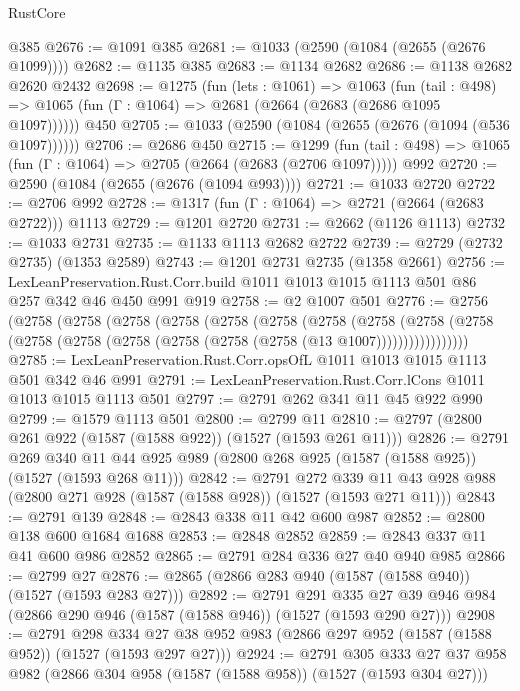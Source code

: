 \begin{lexlean}{RustCore}
\begin{coremodule}
    @385
@2676 := @1091 @385
@2681 := @1033 (@2590 (@1084 (@2655 (@2676 @1099))))
@2682 := @1135 @385
@2683 := @1134 @2682
@2686 := @1138 @2682 @2620 @2432
@2698 := @1275
    (fun (lets : @1061) =>
    @1063
      (fun (tail : @498) => @1065 (fun (Γ : @1064) => @2681 (@2664 (@2683 (@2686 @1095 @1097))))))
    @450
@2705 := @1033 (@2590 (@1084 (@2655 (@2676 (@1094 (@536 @1097))))))
@2706 := @2686 @450
@2715 := @1299
    (fun (tail : @498) => @1065 (fun (Γ : @1064) => @2705 (@2664 (@2683 (@2706 @1097)))))
    @992
@2720 := @2590 (@1084 (@2655 (@2676 (@1094 @993))))
@2721 := @1033 @2720
@2722 := @2706 @992
@2728 := @1317 (fun (Γ : @1064) => @2721 (@2664 (@2683 @2722))) @1113
@2729 := @1201 @2720
@2731 := @2662 (@1126 @1113)
@2732 := @1033 @2731
@2735 := @1133 @1113 @2682 @2722
@2739 := @2729 (@2732 @2735) (@1353 @2589)
@2743 := @1201 @2731 @2735 (@1358 @2661)
@2756 := LexLeanPreservation.Rust.Corr.build
    @1011
    @1013
    @1015
    @1113
    @501
    @86
    @257
    @342
    @46
    @450
    @991
    @919
@2758 := @2 @1007 @501
@2776 := @2756
    (@2758
      (@2758
        (@2758
          (@2758
            (@2758
              (@2758
                (@2758
                  (@2758
                    (@2758
                      (@2758 (@2758 (@2758 (@2758 (@2758 (@2758 (@2758 (@13 @1007)))))))))))))))))
@2785 := LexLeanPreservation.Rust.Corr.opsOfL @1011 @1013 @1015 @1113 @501 @342 @46 @991
@2791 := LexLeanPreservation.Rust.Corr.lCons @1011 @1013 @1015 @1113 @501
@2797 := @2791 @262 @341 @11 @45 @922 @990
@2799 := @1579 @1113 @501
@2800 := @2799 @11
@2810 := @2797 (@2800 @261 @922 (@1587 (@1588 @922)) (@1527 (@1593 @261 @11)))
@2826 := @2791
    @269
    @340
    @11
    @44
    @925
    @989
    (@2800 @268 @925 (@1587 (@1588 @925)) (@1527 (@1593 @268 @11)))
@2842 := @2791
    @272
    @339
    @11
    @43
    @928
    @988
    (@2800 @271 @928 (@1587 (@1588 @928)) (@1527 (@1593 @271 @11)))
@2843 := @2791 @139
@2848 := @2843 @338 @11 @42 @600 @987
@2852 := @2800 @138 @600 @1684 @1688
@2853 := @2848 @2852
@2859 := @2843 @337 @11 @41 @600 @986 @2852
@2865 := @2791 @284 @336 @27 @40 @940 @985
@2866 := @2799 @27
@2876 := @2865 (@2866 @283 @940 (@1587 (@1588 @940)) (@1527 (@1593 @283 @27)))
@2892 := @2791
    @291
    @335
    @27
    @39
    @946
    @984
    (@2866 @290 @946 (@1587 (@1588 @946)) (@1527 (@1593 @290 @27)))
@2908 := @2791
    @298
    @334
    @27
    @38
    @952
    @983
    (@2866 @297 @952 (@1587 (@1588 @952)) (@1527 (@1593 @297 @27)))
@2924 := @2791
    @305
    @333
    @27
    @37
    @958
    @982
    (@2866 @304 @958 (@1587 (@1588 @958)) (@1527 (@1593 @304 @27)))

\end{coremodule}
\end{lexlean}
